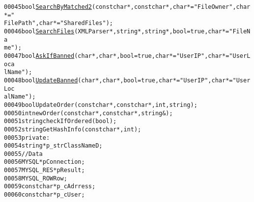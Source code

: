 \begin{footnotesize}
\begin{alltt}
00045         \textcolor{keywordtype}{bool} \hyperlink{classdBase_aa6aba86beb506496929ea8ff8aef8245}{SearchByMatched2}(\textcolor{keyword}{const} \textcolor{keywordtype}{char}*,\textcolor{keyword}{const} \textcolor{keywordtype}{char}*,\textcolor{keywordtype}{char}* =\textcolor{stringliteral}{"FileOwner"},\textcolor{keywordtype}{char}* =\textcolor{stringliteral}{"
      FilePath"},\textcolor{keywordtype}{char}* =\textcolor{stringliteral}{"SharedFiles"});
00046         \textcolor{keywordtype}{bool} \hyperlink{classdBase_a568417f1966cdad5e64f553a96ef201b}{SearchFiles}(XMLParser *,\textcolor{keywordtype}{string} *,\textcolor{keywordtype}{string} *,\textcolor{keywordtype}{bool} =\textcolor{keyword}{true},\textcolor{keywordtype}{char} * =\textcolor{stringliteral}{"FileNa
      me"});
00047         \textcolor{keywordtype}{bool} \hyperlink{classdBase_a9afd72b6a6dbb29f0ae100d5f04cc119}{AskIfBanned}(\textcolor{keywordtype}{char} *,\textcolor{keywordtype}{char}*,\textcolor{keywordtype}{bool} =\textcolor{keyword}{true},\textcolor{keywordtype}{char}* =\textcolor{stringliteral}{"UserIP"},\textcolor{keywordtype}{char}* =\textcolor{stringliteral}{"UserLoca
      lName"});
00048         \textcolor{keywordtype}{bool} \hyperlink{classdBase_ae4b52702ff5312ee8a21b13552c67f7f}{UpdateBanned}(\textcolor{keywordtype}{char} *,\textcolor{keywordtype}{char}*,\textcolor{keywordtype}{bool} =\textcolor{keyword}{true},\textcolor{keywordtype}{char}* =\textcolor{stringliteral}{"UserIP"},\textcolor{keywordtype}{char}* =\textcolor{stringliteral}{"UserLoc
      alName"});
00049         \textcolor{keywordtype}{bool} UpdateOrder(\textcolor{keyword}{const} \textcolor{keywordtype}{char}*,\textcolor{keyword}{const} \textcolor{keywordtype}{char}*,\textcolor{keywordtype}{int},\textcolor{keywordtype}{string});
00050         \textcolor{keywordtype}{int} newOrder(\textcolor{keyword}{const} \textcolor{keywordtype}{char}*,\textcolor{keyword}{const} \textcolor{keywordtype}{char}*,\textcolor{keywordtype}{string} &);
00051         \textcolor{keywordtype}{string} checkIfOrdered(\textcolor{keywordtype}{bool});
00052         \textcolor{keywordtype}{string} GetHashInfo(\textcolor{keyword}{const} \textcolor{keywordtype}{char}*, \textcolor{keywordtype}{int});
00053     \textcolor{keyword}{private}:
00054         \textcolor{keywordtype}{string} *p\_strClassNameD;
00055         \textcolor{comment}{//Data}
00056         MYSQL *pConnection;
00057         MYSQL\_RES *pResult; 
00058         MYSQL\_ROW Row; 
00059         \textcolor{keyword}{const} \textcolor{keywordtype}{char} *p\_cAdrress; 
00060         \textcolor{keyword}{const} \textcolor{keywordtype}{char} *p\_cUser; 

\end{alltt}
\end{footnotesize}

